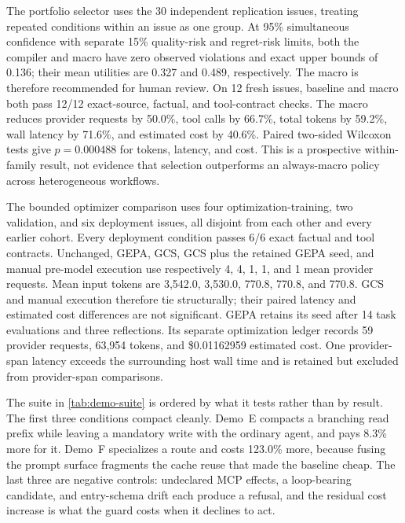 The portfolio selector uses the 30 independent replication issues, treating repeated
conditions within an issue as one group.  At 95\% simultaneous confidence with separate
15\% quality-risk and regret-risk limits, both the compiler and macro have zero observed
violations and exact upper bounds of 0.136; their mean utilities are 0.327 and 0.489,
respectively.  The macro is therefore recommended for human review.  On 12 fresh issues,
baseline and macro both pass 12/12 exact-source, factual, and tool-contract checks.  The
macro reduces provider requests by 50.0\%, tool calls by 66.7\%, total tokens by 59.2\%,
wall latency by 71.6\%, and estimated cost by 40.6\%.  Paired two-sided Wilcoxon tests give
$p=0.000488$ for tokens, latency, and cost.  This is a prospective within-family result,
not evidence that selection outperforms an always-macro policy across heterogeneous
workflows.

The bounded optimizer comparison uses four optimization-training, two validation, and six
deployment issues, all disjoint from each other and every earlier cohort.  Every deployment
condition passes 6/6 exact factual and tool contracts.  Unchanged, GEPA, GCS, GCS plus the
retained GEPA seed, and manual pre-model execution use respectively 4, 4, 1, 1, and 1 mean
provider requests.  Mean input tokens are 3,542.0, 3,530.0, 770.8, 770.8, and 770.8.
GCS and manual execution therefore tie structurally; their paired latency and estimated
cost differences are not significant.  GEPA retains its seed after 14 task evaluations
and three reflections.  Its separate optimization ledger records 59 provider requests,
63,954 tokens, and \$0.01162959 estimated cost.  One provider-span latency exceeds the
surrounding host wall time and is retained but excluded from provider-span comparisons.

\begin{table}[t]
  \centering
  \caption{Per-condition detail for the controlled stress suite plotted in
  \cref{fig:demo-suite}, with the workflow shape that makes each condition hard.  These are
  deterministic fictional fixtures executed against a live provider, not business records:
  they establish boundary behaviour, not field performance.  Demos D, E$'$ and E$''$ are
  negative controls, where leaving the agent unchanged is the only correct outcome and the
  cost increase is the price of the guard refusing.}
  \label{tab:demo-suite}
  \small
  
\end{table}

The suite in \cref{tab:demo-suite} is ordered by what it tests rather than by result.  The
first three conditions compact cleanly.  Demo~E compacts a branching read prefix while
leaving a mandatory write with the ordinary agent, and pays 8.3\% more for it.  Demo~F
specializes a route and costs 123.0\% more, because fusing the prompt surface fragments the
cache reuse that made the baseline cheap.  The last three are negative controls: undeclared
MCP effects, a loop-bearing candidate, and entry-schema drift each produce a refusal, and
the residual cost increase is what the guard costs when it declines to act.
